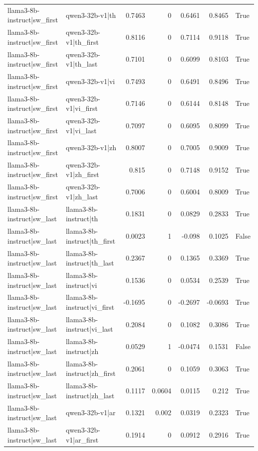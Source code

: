 \begin{table}
\begin{tabular}{l l r r r r l}
llama3-8b-instruct|sw_first & qwen3-32b-v1|th & 0.7463 & 0 & 0.6461 & 0.8465 & True \\
llama3-8b-instruct|sw_first & qwen3-32b-v1|th_first & 0.8116 & 0 & 0.7114 & 0.9118 & True \\
llama3-8b-instruct|sw_first & qwen3-32b-v1|th_last & 0.7101 & 0 & 0.6099 & 0.8103 & True \\
llama3-8b-instruct|sw_first & qwen3-32b-v1|vi & 0.7493 & 0 & 0.6491 & 0.8496 & True \\
llama3-8b-instruct|sw_first & qwen3-32b-v1|vi_first & 0.7146 & 0 & 0.6144 & 0.8148 & True \\
llama3-8b-instruct|sw_first & qwen3-32b-v1|vi_last & 0.7097 & 0 & 0.6095 & 0.8099 & True \\
llama3-8b-instruct|sw_first & qwen3-32b-v1|zh & 0.8007 & 0 & 0.7005 & 0.9009 & True \\
llama3-8b-instruct|sw_first & qwen3-32b-v1|zh_first & 0.815 & 0 & 0.7148 & 0.9152 & True \\
llama3-8b-instruct|sw_first & qwen3-32b-v1|zh_last & 0.7006 & 0 & 0.6004 & 0.8009 & True \\
llama3-8b-instruct|sw_last & llama3-8b-instruct|th & 0.1831 & 0 & 0.0829 & 0.2833 & True \\
llama3-8b-instruct|sw_last & llama3-8b-instruct|th_first & 0.0023 & 1 & -0.098 & 0.1025 & False \\
llama3-8b-instruct|sw_last & llama3-8b-instruct|th_last & 0.2367 & 0 & 0.1365 & 0.3369 & True \\
llama3-8b-instruct|sw_last & llama3-8b-instruct|vi & 0.1536 & 0 & 0.0534 & 0.2539 & True \\
llama3-8b-instruct|sw_last & llama3-8b-instruct|vi_first & -0.1695 & 0 & -0.2697 & -0.0693 & True \\
llama3-8b-instruct|sw_last & llama3-8b-instruct|vi_last & 0.2084 & 0 & 0.1082 & 0.3086 & True \\
llama3-8b-instruct|sw_last & llama3-8b-instruct|zh & 0.0529 & 1 & -0.0474 & 0.1531 & False \\
llama3-8b-instruct|sw_last & llama3-8b-instruct|zh_first & 0.2061 & 0 & 0.1059 & 0.3063 & True \\
llama3-8b-instruct|sw_last & llama3-8b-instruct|zh_last & 0.1117 & 0.0604 & 0.0115 & 0.212 & True \\
llama3-8b-instruct|sw_last & qwen3-32b-v1|ar & 0.1321 & 0.002 & 0.0319 & 0.2323 & True \\
llama3-8b-instruct|sw_last & qwen3-32b-v1|ar_first & 0.1914 & 0 & 0.0912 & 0.2916 & True \\

\end{tabular}
\end{table}
